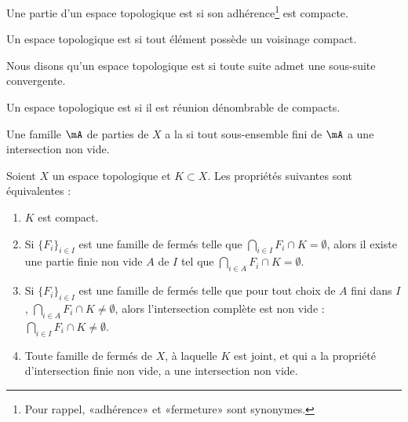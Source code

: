 \begin{definition}      \label{DEFooBODRooEFhzeT}
    Une partie d'un espace topologique est  si son adhérence\footnote{Pour rappel, «adhérence» et «fermeture» sont synonymes.} est compacte.
\end{definition}

\begin{definition}  \label{DefEIBYooAWoESf}
	Un espace topologique est  si tout élément possède un voisinage compact.
\end{definition}

\begin{definition}
	Nous disons qu'un espace topologique est  si toute suite admet une sous-suite convergente.
\end{definition}

\begin{definition}      \label{DefFCGBooLpnSAK}
	Un espace topologique est  si il est réunion dénombrable de compacts.
\end{definition}

\begin{definition}
	Une famille \( \mA\) de parties de \( X\) a la  si tout sous-ensemble fini de \( \mA\) a une intersection non vide.
\end{definition}

\begin{proposition}\label{PropXKUMiCj}
	Soient \( X\) un espace topologique et \( K\subset X\). Les propriétés suivantes sont équivalentes :
	\begin{enumerate}
		\item\label{ItemXYmGHFai}
		      \( K\) est compact.
		\item\label{ItemXYmGHFaii}
		      Si \( \{ F_i \}_{i\in I}\) est une famille de fermés telle que \( \bigcap_{i\in I}F_i \cap K =\emptyset\), alors il existe une partie finie non vide \( A\) de \( I\) tel que \( \bigcap_{i\in A}F_i \cap K =\emptyset\).
		\item\label{ItemXYmGHFaiii}
		      Si \( \{ F_i \}_{i\in I}\) est une famille de fermés telle que pour tout choix de \( A\) fini dans \( I\), \( \bigcap_{i\in A}F_i \cap K \neq\emptyset\), alors l'intersection complète est non vide : \( \bigcap_{i\in I}F_i \cap K\neq\emptyset\).
		\item\label{ItemXYmGHFaiv}
		      Toute famille de fermés de \( X \), à laquelle \( K \) est joint, et qui a la propriété d'intersection finie non vide, a une intersection non vide.
	\end{enumerate}
\end{proposition}

